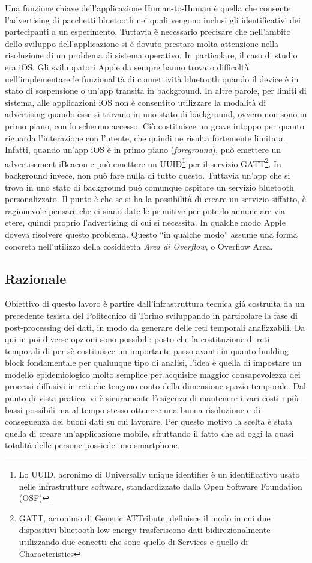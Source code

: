 \documentclass[12pt,twoside]{report}
\begin{document}
	Una funzione chiave dell'applicazione Human-to-Human è quella che consente l'advertising di pacchetti bluetooth nei quali vengono inclusi gli identificativi dei partecipanti a un esperimento. Tuttavia è necessario precisare che nell'ambito dello sviluppo dell'applicazione si è dovuto prestare molta attenzione nella risoluzione di un problema di sistema operativo. In particolare, il caso di studio era iOS. Gli sviluppatori Apple da sempre hanno trovato difficoltà nell'implementare le funzionalità di connettività bluetooth quando il device è in stato di sospensione o un'app transita in background. In altre parole, per limiti di sistema, alle applicazioni iOS non è consentito utilizzare la modalità di advertising quando esse si trovano in uno stato di background, ovvero non sono in primo piano, con lo schermo accesso. Ciò costituisce un grave intoppo per quanto riguarda l'interazione con l'utente, che quindi ne risulta fortemente limitata. 
	Infatti, quando un'app iOS è in primo piano (\textit{foreground}), può emettere un advertisement iBeacon e può emettere un UUID\footnote{Lo UUID, acronimo di Universally unique identifier è un identificativo usato nelle infrastrutture software, standardizzato dalla Open Software Foundation (OSF)  } per il servizio GATT\footnote{GATT, acronimo di Generic ATTribute, definisce il modo in cui due dispositivi bluetooth low energy trasferiscono dati bidirezionalmente utilizzando due concetti che sono quello di Services e quello di Characteristics}. In background invece, non può fare nulla di tutto questo. Tuttavia un'app che si trova in uno stato di background può comunque ospitare un servizio bluetooth personalizzato. Il punto è che se si ha la possibilità di creare un servizio siffatto, è ragionevole pensare che ci siano date le primitive per poterlo annunciare via etere, quindi proprio l'advertising di cui si necessita. In qualche modo Apple doveva risolvere questo problema. Questo ``in qualche modo'' assume una forma concreta nell'utilizzo della cosiddetta \textit{Area di Overflow}, o Overflow Area.
	
	
	
	\subsection{Razionale}
	Obiettivo di questo lavoro è partire dall'infrastruttura tecnica già costruita da un precedente tesista del Politecnico di Torino sviluppando in particolare la fase di post-processing dei dati, in modo da generare delle reti temporali analizzabili. Da qui in poi diverse opzioni sono possibili: posto che la costituzione di reti temporali di per sè costituisce un importante passo avanti in quanto building block fondamentale per qualunque tipo di analisi, l'idea è quella di impostare un modello epidemiologico molto semplice per acquisire maggior consapevolezza dei processi diffusivi in reti che tengono conto della dimensione spazio-temporale. Dal punto di vista pratico, vi è sicuramente l'esigenza di mantenere i vari costi i più bassi possibili ma al tempo stesso ottenere una buona risoluzione e di conseguenza dei buoni dati su cui lavorare. Per questo motivo la scelta è stata quella di creare un'applicazione mobile, sfruttando il fatto che ad oggi la quasi totalità delle persone possiede uno smartphone.
	
\end{document}
